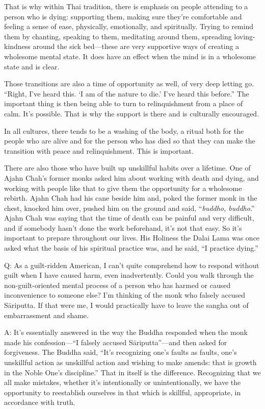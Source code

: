 That is why within Thai tradition, there is emphasis on people attending
to a person who is dying: supporting them, making sure they’re
comfortable and feeling a sense of ease, physically, emotionally, and
spiritually. Trying to remind them by chanting, speaking to them,
meditating around them, spreading loving-kindness around the sick
bed—these are very supportive ways of creating a wholesome mental state.
It does have an effect when the mind is in a wholesome state and is
clear.

Those transitions are also a time of opportunity as well, of very deep
letting go. “Right, I’ve heard this. ‘I am of the nature to die.’ I’ve
heard this before.” The important thing is then being able to turn to
relinquishment from a place of calm. It’s possible. That is why the
support is there and is culturally encouraged.

In all cultures, there tends to be a washing of the body, a ritual both
for the people who are alive and for the person who has died so that
they can make the transition with peace and relinquishment. This is
important.

There are also those who have built up unskillful habits over a
lifetime. One of Ajahn Chah’s former monks asked him about working with
death and dying, and working with people like that to give them the
opportunity for a wholesome rebirth. Ajahn Chah had his cane beside him
and, poked the former monk in the chest, knocked him over, pushed him on
the ground and said, “\emph{buddho, buddho}.” Ajahn Chah was saying that
the time of death can be painful and very difficult, and if somebody
hasn’t done the work beforehand, it’s not that easy. So it’s important
to prepare throughout our lives. His Holiness the Dalai Lama was once
asked what the basis of his spiritual practice was, and he said, “I
practice dying.”

\qaspace
Q: As a guilt-ridden American, I can’t quite comprehend how to respond
without guilt when I have caused harm, even inadvertently. Could you
walk through the non-guilt-oriented mental process of a person who has
harmed or caused inconvenience to someone else? I’m thinking of the monk
who falsely accused Sāriputta. If that were me, I would practically have
to leave the sangha out of embarrassment and shame.

\qaspace
A: It’s essentially answered in the way the Buddha responded when the
monk made his confession—“I falsely accused Sāriputta”—and then asked
for forgiveness. The Buddha said, “It’s recognizing one’s faults as
faults, one’s unskillful action as unskillful action and wishing to make
amends: that is growth in the Noble One’s discipline.” That in itself is
the difference. Recognizing that we all make mistakes, whether it’s
intentionally or unintentionally, we have the opportunity to reestablish
ourselves in that which is skillful, appropriate, in accordance with
truth.

